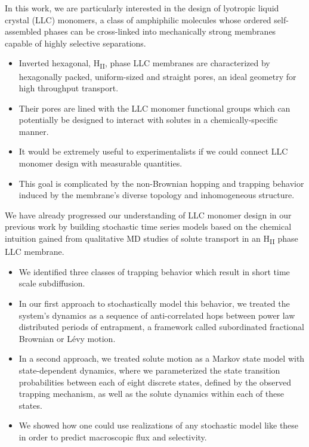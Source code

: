 \documentclass[journal=jpcbfk,manuscript=article]{achemso}
\begin{document}
  In this work, we are particularly interested in the design of lyotropic liquid crystal (LLC)
  monomers, a class of amphiphilic molecules whose ordered self-assembled phases can be 
  cross-linked into mechanically strong membranes capable of highly selective separations.
  \begin{itemize}
  	\item Inverted hexagonal, H\textsubscript{II}, phase LLC membranes are characterized
  	by hexagonally packed, uniform-sized and straight pores, an ideal geometry for high 
  	throughput transport.
	\item Their pores are lined with the LLC monomer functional groups which can
	potentially be designed to interact with solutes in a chemically-specific manner.
	\item It would be extremely useful to experimentalists if we could connect LLC monomer
	design with measurable quantities.
	\item This goal is complicated by the non-Brownian hopping and trapping behavior induced
	by the membrane's diverse topology and inhomogeneous structure.~\cite{coscia_understanding_2019,coscia_chemically_2019}
  \end{itemize}
  
  We have already progressed our understanding of LLC monomer design in our previous work
  by building stochastic time series models based on the chemical intuition gained
  from qualitative MD studies of solute transport in an H\textsubscript{II} phase LLC
  membrane.~\cite{coscia_chemically_2019,coscia_capturing_2020}
  \begin{itemize}
    \item We identified three classes of trapping behavior which result in short time scale
    subdiffusion.
    \item In our first approach to stochastically model this behavior, we treated the
    system's dynamics as a sequence of anti-correlated hops between power law distributed
    periods of entrapment, a framework called subordinated fractional Brownian or L\'evy
    motion.
    \item In a second approach, we treated solute motion as a Markov state model with 
    state-dependent dynamics, where we parameterized the state transition probabilities 
    between each of eight discrete states, defined by the observed trapping mechanism, 
    as well as the solute dynamics within each of these states. 
    \item We showed how one could use realizations of any stochastic model like these in
    order to predict macroscopic flux and selectivity. 
  \end{itemize}
  
\end{document}

